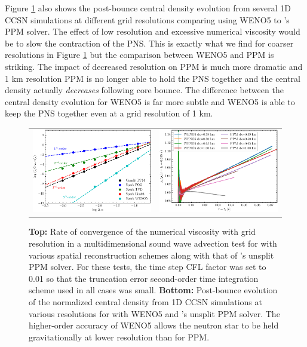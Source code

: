 Figure \ref{fig:converge} also shows the post-bounce central density evolution from several 1D CCSN simulations at different grid resolutions comparing \sparkmone using WENO5 to \flash's PPM solver.
The effect of low resolution and excessive numerical viscosity would be to slow the contraction of the PNS.
This is exactly what we find for coarser resolutions in Figure \ref{fig:converge} but the comparison between WENO5 and PPM is striking.
The impact of decreased resolution on PPM is much more dramatic and 1 km resolution PPM is no longer able to hold the PNS together and the central density actually {\it decreases} following core bounce.
The difference between the central density evolution for WENO5 is far more subtle and WENO5 is able to keep the PNS together even at a grid resolution of 1 km.


\begin{figure}
  \begin{tabular}{cc}
    \includegraphics[width=3.12in]{figs/convergence} &
    \includegraphics[width=3.12in]{figs/centralDens}
  \end{tabular}
  \caption{{\bf Top:} Rate of convergence of the numerical viscosity with grid resolution in a multidimensional sound wave advection test for \spark with various spatial reconstruction schemes along with that of \flash's unsplit PPM solver. For these tests, the time step CFL factor was set to 0.01 so that the truncation error second-order time integration scheme used in all cases was small. {\bf Bottom:} Post-bounce evolution of the normalized central density from 1D CCSN simulations at various resolutions for \spark with WENO5 and \flash's unsplit PPM solver.  The higher-order accuracy of WENO5 allows the neutron star to be held gravitationally at lower resolution than for PPM.}
  \label{fig:converge}
\end{figure}

